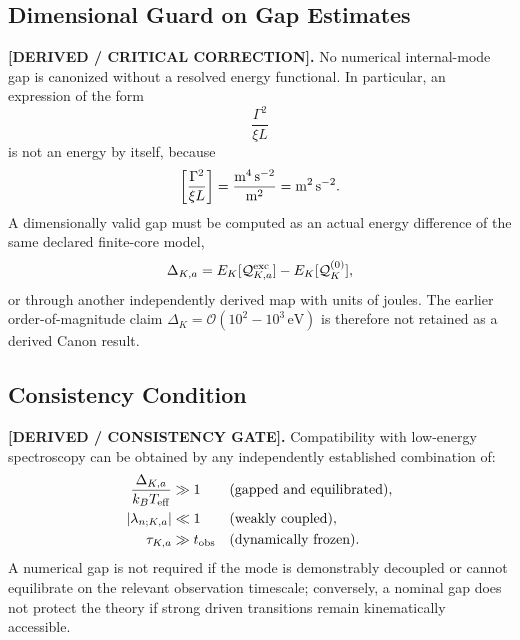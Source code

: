     \subsection{Dimensional Guard on Gap Estimates}

        \textbf{[DERIVED / CRITICAL CORRECTION].}
        No numerical internal-mode gap is canonized without a resolved energy
        functional.  In particular, an expression of the form
        \begin{equation}
            \frac{\Gamma^2}{\xi L}
        \end{equation}
        is not an energy by itself, because
        \begin{equation}
            \left[\frac{\Gamma^2}{\xi L}\right]
            =
            \frac{{\rm m^4\,s^{-2}}}{{\rm m^2}}
            =
            {\rm m^2\,s^{-2}} .
            \label{eq:canon_gap_dimensional_guard}
        \end{equation}
        A dimensionally valid gap must be computed as an actual energy
        difference of the same declared finite-core model,
        \begin{equation}
            \Delta_{K,a}
            =
            E_K[\mathcal Q_{K,a}^{\rm exc}]
            -
            E_K[\mathcal Q_K^{(0)}],
            \label{eq:canon_gap_energy_difference}
        \end{equation}
        or through another independently derived map with units of joules.
        The earlier order-of-magnitude claim
        $\Delta_K=\mathcal O(10^2\!-
        10^3\,\mathrm{eV})$ is therefore not retained as a derived Canon result.

    \subsection{Consistency Condition}

        \textbf{[DERIVED / CONSISTENCY GATE].}
        Compatibility with low-energy spectroscopy can be obtained by any
        independently established combination of:
        \begin{align}
            \frac{\Delta_{K,a}}{k_BT_{\rm eff}} &\gg 1
            &&\text{(gapped and equilibrated)},
            \label{eq:canon_gap_freeze_condition}\\
            |\lambda_{n;K,a}| &\ll 1
            &&\text{(weakly coupled)},
            \label{eq:canon_weak_mode_coupling}\\
            \tau_{K,a} &\gg t_{\rm obs}
            &&\text{(dynamically frozen)}.
            \label{eq:canon_mode_frozen_condition}
        \end{align}
        A numerical gap is not required if the mode is demonstrably decoupled or
        cannot equilibrate on the relevant observation timescale; conversely, a
        nominal gap does not protect the theory if strong driven transitions
        remain kinematically accessible.


